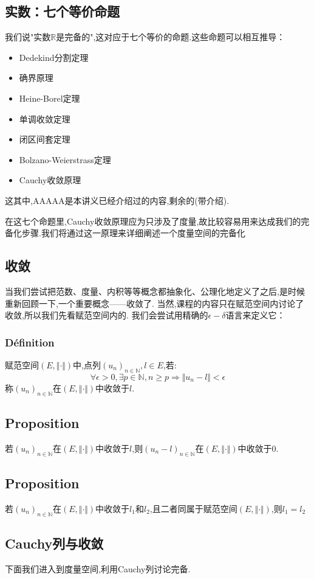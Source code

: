 \documentclass[12pt, a4paper, oneside]{ctexbook}
\newcommand{\R }{\mathbb{R}}%
\begin{document}
  \subsection{实数：七个等价命题}
  我们说"实数$\R$是完备的",这对应于七个等价的命题.这些命题可以相互推导：
  \begin{itemize}
    \item Dedekind分割定理
    \item 确界原理
    \item Heine-Borel定理
    \item 单调收敛定理
    \item 闭区间套定理
    \item Bolzano-Weierstrass定理
    \item Cauchy收敛原理
  \end{itemize}
  这其中,AAAAA是本讲义已经介绍过的内容,剩余的(带介绍).

  在这七个命题里,Cauchy收敛原理应为只涉及了度量,故比较容易用来达成我们的完备化步骤.我们将通过这一原理来详细阐述一个度量空间的完备化
  \subsection{收敛}
  当我们尝试把范数、度量、内积等等概念都抽象化、公理化地定义了之后,是时候重新回顾一下,一个重要概念——收敛了.
  当然,课程的内容只在赋范空间内讨论了收敛,所以我们先看赋范空间内的.
  我们会尝试用精确的$\epsilon-\delta$语言来定义它：
  \subsubsection{Définition}
  赋范空间$(E,\Vert \cdot \Vert)$中,点列$(u_n)_{n\in\mathbb{N}},l\in E$,若:
  $$
    \forall\epsilon>0, \exists p\in \mathbb{N}, n\ge p\Rightarrow \Vert u_n-l \Vert<\epsilon
  $$
  称$(u_n)_{n\in\mathbb{N}}$在$(E,\Vert \cdot \Vert)$中收敛于$l$.
  \subsection{Proposition}
  若$(u_n)_{n\in\mathbb{N}}$在$(E,\Vert \cdot \Vert)$中收敛于$l$,则$(u_n-l)_{n\in\mathbb{N}}$在$(E,\Vert \cdot \Vert)$中收敛于$0$.
  \subsection{Proposition}
  若$(u_n)_{n\in\mathbb{N}}$在$(E,\Vert \cdot \Vert)$中收敛于$l_1$和$l_2$,且二者同属于赋范空间$(E,\Vert \cdot \Vert)$,则$l_1=l_2$
  
  
  \subsection{Cauchy列与收敛}
  下面我们进入到度量空间,利用Cauchy列讨论完备.
\end{document}
